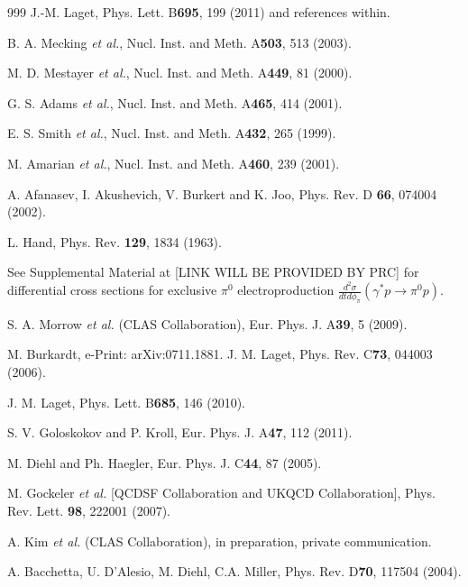 \documentclass[prc,floatfix,twocolumn,superscriptaddress,letter]{revtex4}
\begin{document}
\begin{thebibliography} {999}
 J.-M. Laget, Phys. Lett.  B{\bf695}, 199 (2011) and references within.


 B. A. Mecking {\it et al.}, Nucl. Inst. and Meth. A{\bf503}, 513 (2003).


M. D. Mestayer {\it et al.},  Nucl. Inst. and Meth. A{\bf449}, 81 (2000).

G. S. Adams {\it et al.}, Nucl. Inst. and Meth. A{\bf465}, 414 (2001).

E. S. Smith {\it et al.}, Nucl. Inst. and Meth. A{\bf432}, 265 (1999).

M. Amarian {\it et al.}, Nucl. Inst. and Meth. A{\bf460}, 239 (2001).

 A. Afanasev, I. Akushevich, V. Burkert and  K. Joo,  Phys. Rev.  D {\bf66}, 074004 (2002).


 L. Hand, Phys. Rev. {\bf129}, 1834 (1963).

 See Supplemental Material at [LINK WILL BE PROVIDED BY PRC] for differential cross sections for exclusive $\pi^0$ electroproduction \mbox{$\frac{d^2\sigma}{dtd\phi_\pi}(\gamma^*p\to\pi^0p)$}.

 S. A. Morrow {\it et al.} (CLAS Collaboration), Eur. Phys. J. A{\bf 39}, 5 (2009).


 M. Burkardt, e-Print: arXiv:0711.1881. 
J. M. Laget, Phys. Rev. C{\bf73},  044003  (2006). 

J. M. Laget, Phys. Lett. B{\bf685}, 146  (2010).

S. V. Goloskokov and P. Kroll, Eur. Phys. J.  A{\bf47}, 112 (2011).




 M. Diehl and Ph. Haegler, Eur. Phys. J. C{\bf 44}, 87 (2005).

M. Gockeler {\it et al.} [QCDSF Collaboration and UKQCD Collaboration], Phys. Rev. Lett. {\bf98}, 222001 (2007).

A. Kim {\it et al.} (CLAS Collaboration), in preparation,  private communication.

  A. Bacchetta, U. D'Alesio, M. Diehl, C.A. Miller, Phys. Rev. D{\bf 70}, 117504 (2004).
\end{thebibliography}
\end{document}
